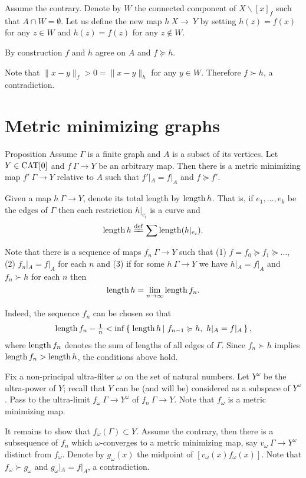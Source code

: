 \documentclass{article}
\begin{document}
Assume the contrary.
Denote by $W$ the connected component of $X\backslash [x]_f$ such that $A\cap W=\emptyset$.
Let us define the new map $h\:X\to\ Y$ by setting $h(z)=f(x)$ for any $z\in W$ and $h(z)=f(z)$ for any $z\notin W$.

By construction $f$ and $h$ agree on $A$ and $f\succcurlyeq h$.

Note that $\|x-y\|_f>0=\|x-y\|_h$ for any $y\in W$.
Therefore $f\succ h$, a contradiction.
\qeds



\section{Metric minimizing graphs}



\begin{thm}{Proposition}\label{prop:memigraph}
Assume $\Gamma$ is a  finite graph and $A$ is a subset of its vertices.
Let $Y\in\mathop{\rm CAT}\nolimits[0]$ and $f\:\Gamma\to Y$ be an arbitrary map.
Then there is a metric minimizing map $f'\:\Gamma\to Y$ relative to $A$ such that
$f'|_A=f|_A$ and 
$f\succcurlyeq f'$.
\end{thm} 

Given a map $h\:\Gamma\to Y$, denote its total length by $\mathop{\rm length}\nolimits h$.
That is, if $e_1,\dots,e_k$ be the edges of $\Gamma$ 
then each restriction $h|_{e_i}$ is a curve and
\[\length h
\df
\sum\length(h|_{e_i}).\]

Note that there is a sequence of maps $f_n\:\Gamma\to Y$
such that (1)
$f=f_0\succcurlyeq f_1\succcurlyeq\dots$, (2) $f_n|_A=f|_A$ for each $n$ and (3) if for some $h\:\Gamma\to Y$ we have $h|_A=f|_A$ and $f_n\succ h$ for each $n$ then 
\[\mathop{\rm length}\nolimits h=\lim_{n\to\infty}\mathop{\rm length}\nolimits f_n.\]

Indeed, the sequence $f_n$ can be chosen so that
\[\length f_n-\tfrac1n
<
\inf\set{\length h}{f_{n-1}\succcurlyeq h,\ h|_A=f|_A},\]
where $\mathop{\rm length}\nolimits f_n$ denotes the sum of lengths of all edges of $\Gamma$. %
Since $f_n\succ h$ implies $\mathop{\rm length}\nolimits f_n>\mathop{\rm length}\nolimits h$, 
the conditions above hold.

Fix a non-principal ultra-filter $\omega$ on the set of natural numbers.
Let $Y^\omega$ be the ultra-power of $Y$;
recall that $Y$ can be (and will be) considered as a subspace of $Y^\omega$.
Pass to the ultra-limit $f_\omega\:\Gamma\to Y^\omega$ 
of $f_n\:\Gamma\to Y$.
Note that $f_\omega$ is a metric minimizing map.

It remains to show that $f_\omega(\Gamma)\subset Y$.
Assume the contrary, then there is a subsequence of $f_n$ which $\omega$-converges to a metric minimizing map, say $v_\omega\:\Gamma\to Y^\omega$ distinct from $f_\omega$.
Denote by $g_\omega(x)$ the midpoint of $[v_\omega(x)f_\omega(x)]$.
Note that $f_\omega\succ g_\omega$ and $g_\omega|_A=f|_A$, a contradiction.
\qeds
\end{document}
